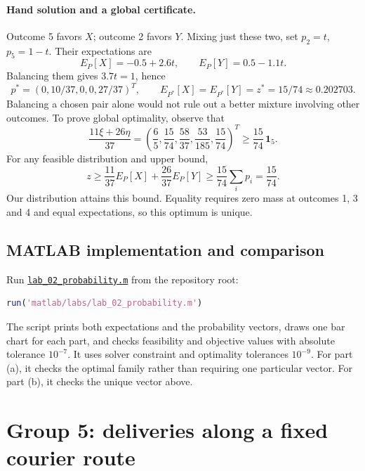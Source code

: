 \documentclass[11pt,a4paper]{article}
\begin{document}
\paragraph{Hand solution and a global certificate.}
Outcome 5 favors $X$; outcome 2 favors $Y$. Mixing just these two, set
$p_2=t$, $p_5=1-t$. Their expectations are
\[
  E_P[X]=-0.5+2.6t,\qquad E_P[Y]=0.5-1.1t.
\]
Balancing them gives $3.7t=1$, hence
\[
  p^*=(0,10/37,0,0,27/37)^T,\qquad
  E_{P^*}[X]=E_{P^*}[Y]=z^*=15/74\approx0.202703.
\]
Balancing a chosen pair alone would not rule out a better mixture involving
other outcomes. To prove global optimality, observe that
\[
  \frac{11\xi+26\eta}{37}
  =\left(\frac65,\frac{15}{74},\frac{58}{37},\frac{53}{185},\frac{15}{74}\right)^T
  \geq\frac{15}{74}\,\mathbf1_5.
\]
For any feasible distribution and upper bound,
\[
  z\geq\frac{11}{37}E_P[X]+\frac{26}{37}E_P[Y]
  \geq\frac{15}{74}\sum_i p_i=\frac{15}{74}.
\]
Our distribution attains this bound. Equality requires zero mass at outcomes
1, 3 and 4 and equal expectations, so this optimum is unique.

\subsection{MATLAB implementation and comparison}
Run \href{run:matlab/labs/lab_02_probability.m}{\texttt{lab\_02\_probability.m}}
from the repository root:
\begin{lstlisting}[language=Matlab]
run('matlab/labs/lab_02_probability.m')
\end{lstlisting}
The script prints both expectations and the probability vectors, draws one bar
chart for each part, and checks feasibility and objective values with absolute
tolerance $10^{-7}$. It uses solver constraint and optimality tolerances
$10^{-9}$. For part (a), it checks the optimal family rather than requiring
one particular vector. For part (b), it checks the unique vector above.

\section{Group 5: deliveries along a fixed courier route}\label{sec:courier}
\end{document}
